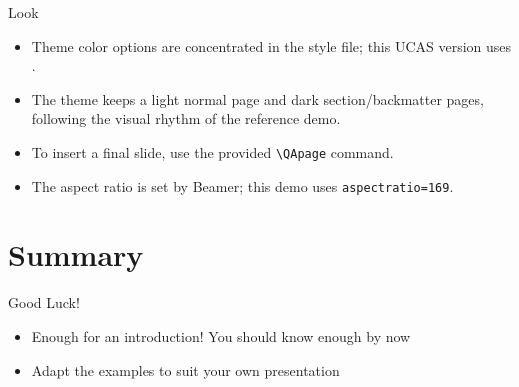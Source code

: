 \documentclass[aspectratio=169]{beamer}
\begin{document}
\begin{frame}{Look}
  \begin{itemize}
    \item Theme color options are concentrated in the style file; this UCAS
      version uses .
    \item The theme keeps a light normal page and dark section/backmatter pages,
      following the visual rhythm of the reference demo.
    \item To insert a final slide, use the provided \texttt{\textbackslash{}QApage} command.
    \item The aspect ratio is set by Beamer; this demo uses
      \texttt{aspectratio=169}.
  \end{itemize}
\end{frame}

\section{Summary}

\begin{frame}{Good Luck!}
  \begin{itemize}
    \item Enough for an introduction! You should know enough by now
    \item Adapt the examples to suit your own presentation
  \end{itemize}
\end{frame}

\QApage
\end{document}
